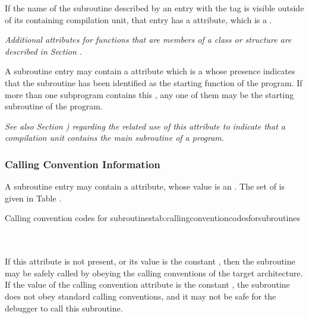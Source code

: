 If the name of the subroutine described by an entry with the
tag \DWTAGsubprogram{}\hypertarget{chap:DWATexternalexternalsubroutine}{}
is visible outside of its containing
compilation unit, that entry has a 
\DWATexternalDEFN{} attribute,
which is a .

\textit{Additional attributes for functions that are members of a
class or structure are described in 
Section .
}

A\hypertarget{chap:DWATmainsubprogrammainorstartingsubprogram}{}
subroutine entry may contain a 
\DWATmainsubprogramDEFN{} attribute 
which is 
a \CLASSflag{} whose presence indicates that the
subroutine has been identified as the starting function of
the program.  If more than one subprogram contains this 
,
any one of them may be the starting subroutine of the program.

\textit{See also Section ) regarding the
related use of this attribute to indicate that a compilation
unit contains the main subroutine of a program.}

\subsubsection{Calling Convention Information}
\hypertarget{chap:DWATcallingconventionforsubprograms}{}
A subroutine entry may contain a 
\DWATcallingconventionDEFN{}
attribute, whose value is an 
. The set of
is given in Table .

\begin{simplenametable}[1.4in]{Calling convention codes for subroutines}{tab:callingconventioncodesforsubroutines}
\DWCCnormal        \\
\DWCCprogram       \\
\DWCCnocall        \\
\end{simplenametable}

If this attribute is not present, or its value is the constant
\DWCCnormalTARG, then the subroutine may be safely called by
obeying the  calling conventions of the target
architecture. If the value of the calling convention attribute
is the constant \DWCCnocallTARG, the subroutine does not obey
standard calling conventions, and it may not be safe for the
debugger to call this subroutine.


